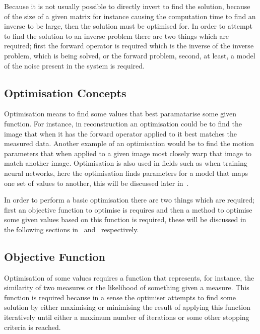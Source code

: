             Because it is not usually possible to directly invert to find the solution, because of the size of a given matrix for instance causing the computation time to find an inverse to be large, then the solution must be optimised for. In order to attempt to find the solution to an inverse problem there are two things which are required; first the forward operator is required which is the inverse of the inverse problem, which is being solved, or the forward problem, second, at least, a model of the noise present in the system is required.
        
        \subsection{Optimisation Concepts} \label{sec:optimisation_concepts}
            Optimisation means to find some values that best paramatarise some given function. For instance, in reconstruction an optimisation could be to find the image that when it has the forward operator applied to it best matches the measured data. Another example of an optimisation would be to find the motion parameters that when applied to a given image most closely warp that image to match another image. Optimisation is also used in fields such as when training neural networks, here the optimisation finds parameters for a model that maps one set of values to another, this will be discussed later in~.
            
            In order to perform a basic optimisation there are two things which are required; first an objective function to optimise is requires and then a method to optimise some given values based on this function is required, these will be discussed in the following sections in~ and~ respectively.
        
        \subsection{Objective Function} \label{sec:objective_function}
            Optimisation of some values requires a function that represents, for instance, the similarity of two measures or the likelihood of something given a measure. This function is required because in a sense the optimiser attempts to find some solution by either maximising or minimising the result of applying this function iteratively until either a maximum number of iterations or some other stopping criteria is reached.
            
